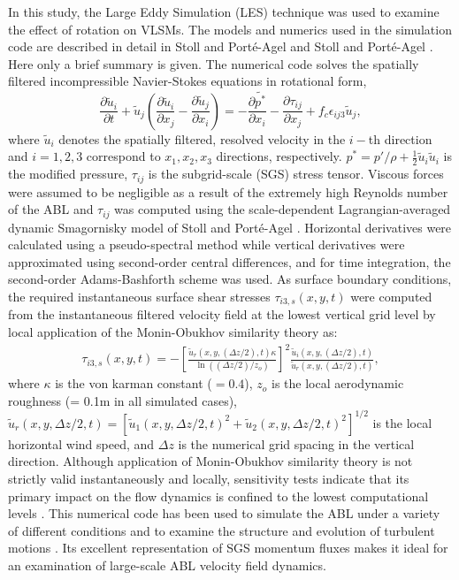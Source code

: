 In this study, the Large Eddy Simulation (LES) technique was used to examine the effect of rotation on VLSMs. The models and numerics used in the simulation code are described in detail in Stoll and Port{\'e}-Agel \cite{stoll_wrr_2006} and Stoll and Port{\'e}-Agel \cite{stoll_blm_2008}.  Here only a brief summary is given.  The numerical code solves the spatially filtered incompressible Navier-Stokes equations in rotational form,
\begin{equation}
    \frac{\partial \tilde{u}_i}{\partial t}+ \tilde{u}_j\left(\frac{\partial \tilde{u}_i}{\partial x_{j}} -\frac{\partial \tilde{u}_j}{\partial x_{i}} \right)  = -\frac{\partial \tilde{p^*}}{\partial x_i}-\frac{\partial \tau_{ij}}{\partial x_j}+f_{c}\epsilon_{ij3}\tilde{u}_{j},  
\label{eqn:les_eqn_chap1}
\end{equation}
\noindent where $\tilde{u}_i$ denotes the spatially filtered, resolved velocity in the $i-$th direction and $i=1, 2, 3$ correspond to $x_1, x_2, x_3$ directions, respectively. $p^{*}=p'/\rho + \frac{1}{2}\tilde{u}_i\tilde{u}_i$ is the modified pressure, $\tau_{ij}$ is the subgrid-scale (SGS) stress tensor. Viscous forces were assumed to be negligible as a result of the extremely high Reynolds number of the ABL and $\tau_{ij}$ was computed using the scale-dependent Lagrangian-averaged dynamic Smagornisky model of  Stoll and Port{\'e}-Agel \cite{stoll_wrr_2006}. Horizontal derivatives were calculated using a pseudo-spectral method while vertical derivatives were approximated using second-order central differences, and for time integration, the second-order Adams-Bashforth scheme was used. As surface boundary conditions, the required instantaneous surface shear stresses $\tau_{i3,s}(x,y,t)$  were computed from the instantaneous filtered velocity field at the lowest vertical grid level by local application of the Monin-Obukhov similarity theory \cite{stoll_blm_2006} as:
\begin{align}
\tau_{i3,s}(x,y,t) = -\left [ \frac{\tilde{u}_r(x,y,(\Delta z/2),t)\kappa}{\ln((\Delta z/2)/z_o)} \right ]^2\frac{\tilde{u}_i(x,y,(\Delta z/2),t)}{\tilde{u}_r(x,y,(\Delta z/2),t)}, 
\end{align}
\noindent where $\kappa$ is the von karman constant ($=0.4$), $z_o$ is the local aerodynamic roughness (= 0.1m in all simulated cases), $\tilde{u}_r(x,y,\Delta z/2,t)=[\tilde{u}_1(x,y,\Delta z/2,t)^{2}+\tilde{u}_2(x,y,\Delta z/2,t)^{2}]^{1/2}$ is the local horizontal wind speed, and $\Delta z$ is the numerical grid spacing in the vertical direction. Although application of Monin-Obukhov similarity theory is not strictly valid instantaneously and locally, sensitivity tests indicate that its primary impact on the flow dynamics is confined to the lowest computational levels \cite{stoll_blm_2006}. This numerical code has been used to simulate the ABL under a variety of different conditions \cite[e.g.,]{stoll_jas_2009,bailey_blm_2013,miller_blm_2013} and to examine the structure and evolution of turbulent motions \cite[e.g.,]{bailey_ae_2014,bailey_jfm_2016}.  Its excellent representation of SGS momentum fluxes \cite{stoll_wrr_2006} makes it ideal for an examination of large-scale ABL velocity field dynamics.

